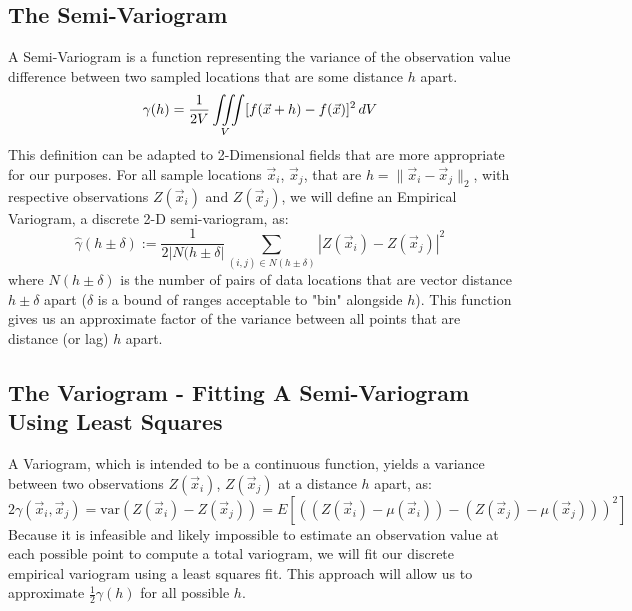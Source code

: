 \documentclass[11pt]{ucthesis}
\begin{document}
\subsection{The Semi-Variogram}
A Semi-Variogram is a function representing the variance of the observation value difference between two sampled locations that are some distance $h$ apart. 
\begin{equation}
	\gamma(h)=\frac{1}{2V}\iiint\limits_V [f(\vec{x}+h)-f(\vec{x})]^2 \,dV \\
\end{equation}
This definition can be adapted to 2-Dimensional fields that are more appropriate for our purposes. For all sample locations $\vec{x}_{i}$, $\vec{x}_{j}$, that are $h=\|\vec{x}_{i} - \vec{x}_{j} \|_{2}$, with respective observations $Z(\vec{x}_{i})$ and $Z(\vec{x}_{j})$, we will define an Empirical Variogram, a discrete 2-D semi-variogram, as:
\begin{equation}
	\hat{\gamma}(h\pm\delta) := \frac{1}{2|N(h\pm\delta|}\sum\limits_{(i,j)\in N(h\pm\delta)}|Z(\vec{x}_i) - Z(\vec{x}_j)|^2 %
\end{equation}
where $N(h\pm\delta)$ is the number of pairs of data locations that are vector distance $h\pm\delta$ apart ($\delta$ is a bound of ranges acceptable to "bin" alongside $h$).
This function gives us an approximate factor of the variance between all points that are distance (or lag) $h$ apart.

\subsection{The Variogram - Fitting A Semi-Variogram Using Least Squares}
A Variogram, which is intended to be a continuous function, yields a variance between two observations $Z(\vec{x}_{i})$, $Z(\vec{x}_{j})$ at a distance $h$ apart, as:
\begin{equation}
2\gamma(\vec{x}_i, \vec{x}_j)= \text{var} (Z(\vec{x}_{i}) - Z(\vec{x}_{j}))=E[( (Z(\vec{x}_{i}) - \mu(\vec{x}_i) ) - (Z(\vec{x}_{j}) - \mu(\vec{x}_j) ))^2]
\end{equation} %
Because it is infeasible and likely impossible to estimate an observation value at each possible point to compute a total variogram, we will fit our discrete empirical variogram using a least squares fit. This approach will allow us to approximate $\frac{1}{2}\gamma(h)$ for all possible $h$.
\end{document}
